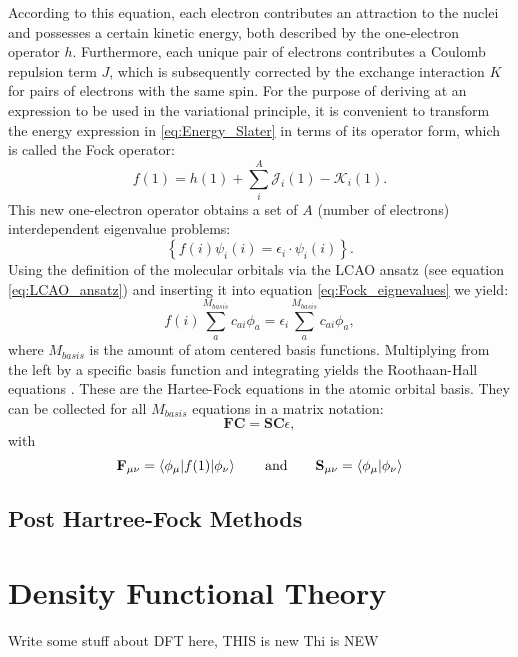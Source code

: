 According to this equation, each electron contributes an attraction to the nuclei and possesses a certain kinetic energy, both described by the one-electron operator $h$. Furthermore, each unique pair of electrons contributes a Coulomb repulsion term $J$, which is subsequently corrected by the exchange interaction $K$ for pairs of electrons with the same spin. For the purpose of deriving at an expression to be used in the variational principle, it is convenient to transform the energy expression in \ref{eq:Energy_Slater} in terms of its operator form, which is called the Fock operator:
\begin{equation}
    f(1) = h(1) + \sum_{i}^{A}\mathcal{J}_{i}(1)-\mathcal{K}_{i}(1).
    \label{eq:fock_operator}
\end{equation}
This new one-electron operator obtains a set of $A$ (number of electrons) interdependent eigenvalue problems: 
\begin{equation}
    \left\{
    f(i)\psi_{i}(i) = \epsilon_{i} \cdot \psi_{i}(i) \right\}.
    \label{eq:Fock_eignevalues}
\end{equation}
Using the definition of the molecular orbitals via the LCAO ansatz (see equation \ref{eq:LCAO_ansatz}) and inserting it into equation \ref{eq:Fock_eignevalues} we yield:
\begin{equation}
    f(i)\sum_{a}^{M_{basis}}c_{ai}\phi_{a} = \epsilon_{i}\sum_{a}^{M_{basis}}c_{ai}\phi_{a},
    \label{eq:Fock_eignevalues_plugged_in}
\end{equation}
where $M_{basis}$ is the amount of atom centered basis functions. Multiplying from the left by a specific basis function and integrating yields the Roothaan-Hall equations \cite{RevModPhys.23.69}. These are the Hartee-Fock equations in the atomic orbital basis. They can be collected for all $M_{basis}$ equations in a matrix notation:
\begin{equation}
    \textbf{FC} = \textbf{SC}\epsilon, 
    \label{eq:Hartree_fock_equation_matrix}
\end{equation}
with 
\begin{equation}
    \textbf{F}_{\mu\nu} = \braket{\phi_{\mu}|f(1)|\phi_{\nu}} \qquad \mathrm{and} \qquad \textbf{S}_{\mu\nu} = \braket{\phi_{\mu}|\phi_{\nu}}
    \label{eq:Fock_matrix}
\end{equation}
\subsection{Post Hartree-Fock Methods}
\label{sec:Post_Hartree-Fock_Methods}

\section{Density Functional Theory}
\label{sec:DFT}
Write some stuff about DFT here, THIS is new
Thi is NEW 
